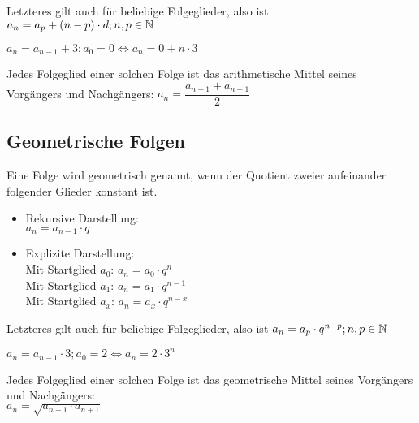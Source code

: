 \begin{Bemerkung}
Letzteres gilt auch für beliebige Folgeglieder, also ist $a_{n}=a_{p}+(n-p)\cdot d;n,p\in\mathbb{N}$
\end{Bemerkung}

\begin{Beispiel}
$a_{n}=a_{n-1}+3;a_{0}=0\Leftrightarrow a_{n}=0+n\cdot3$
\end{Beispiel}

\begin{Bemerkung}
Jedes Folgeglied einer solchen Folge ist das arithmetische Mittel seines Vorgängers und Nachgängers: $a_{n}=\dfrac{a_{n-1}+a_{n+1}}{2}$
\end{Bemerkung}

	\subsection{Geometrische Folgen}

\begin{Definition}
Eine Folge wird geometrisch genannt, wenn der Quotient zweier aufeinander folgender Glieder konstant ist.
\begin{itemize}
\item Rekursive Darstellung:\\
\indent $a_{n}=a_{n-1}\cdot q$
\item Explizite Darstellung:\\
\indent Mit Startglied $a_{0}$: $a_{n}=a_{0}\cdot q^n$\\
\indent Mit Startglied $a_{1}$: $a_{n}=a_{1}\cdot q^{n-1}$\\
\indent Mit Startglied $a_{x}$: $a_{n}=a_{x}\cdot q^{n-x}$\\
\end{itemize}
\end{Definition}

\begin{Bemerkung}
Letzteres gilt auch für beliebige Folgeglieder, also ist $a_{n}=a_{p}\cdot q^{n-p};n,p\in\mathbb{N}$
\end{Bemerkung}

\begin{Beispiel}
$a_{n}=a_{n-1}\cdot3;a_{0}=2\Leftrightarrow a_{n}=2\cdot3^n$
\end{Beispiel}

\begin{Bemerkung}
Jedes Folgeglied einer solchen Folge ist das geometrische Mittel seines Vorgängers und Nachgängers:\\
 $a_{n}=\sqrt{a_{n-1}\cdot a_{n+1}}$
\end{Bemerkung}

